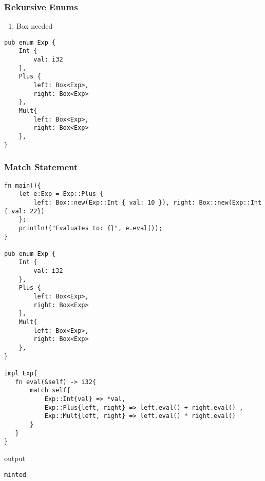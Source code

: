 \documentclass[a4paper, 1ppt]{article}
\begin{document}
\subsubsection{Rekursive Enums}
\begin{enumerate}
	\item Box needed
\end{enumerate}
\begin{verbatim}
pub enum Exp {
    Int {
        val: i32
    },
    Plus {
        left: Box<Exp>,
        right: Box<Exp>
    },
    Mult{
        left: Box<Exp>,
        right: Box<Exp>
    },
}
\end{verbatim}
\subsubsection{Match Statement}
\begin{verbatim}
fn main(){
    let e:Exp = Exp::Plus { 
        left: Box::new(Exp::Int { val: 10 }), right: Box::new(Exp::Int { val: 22})
    };
    println!("Evaluates to: {}", e.eval());
}

pub enum Exp {
    Int {
        val: i32
    },
    Plus {
        left: Box<Exp>,
        right: Box<Exp>
    },
    Mult{
        left: Box<Exp>,
        right: Box<Exp>
    },
}

impl Exp{
   fn eval(&self) -> i32{
       match self{
           Exp::Int{val} => *val,
           Exp::Plus{left, right} => left.eval() + right.eval() ,
           Exp::Mult{left, right} => left.eval() * right.eval()
       }
   }
}
\end{verbatim}
output
\begin{verbatim}
minted\end{verbatim}
\end{document}
